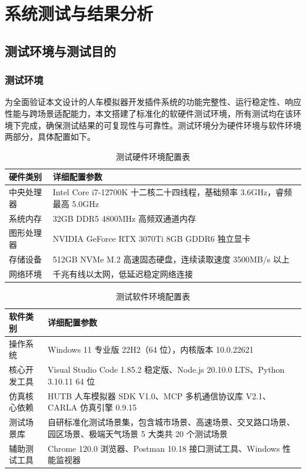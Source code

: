 
\chapter{系统测试与结果分析}

\section{测试环境与测试目的}

\subsection{测试环境}

为全面验证本文设计的人车模拟器开发插件系统的功能完整性、运行稳定性、响应性能与跨场景适配能力，本文搭建了标准化的软硬件测试环境，所有测试均在该环境下完成，确保测试结果的可复现性与可靠性。测试环境分为硬件环境与软件环境两部分，具体配置如下。

\begin{table}[H]
\centering
\caption{测试硬件环境配置表}
\label{tab:5-1}
\small
\renewcommand{\arraystretch}{1.18}
\begin{tabularx}{\textwidth}{p{}X}
\toprule
硬件类别 & 详细配置参数 \\
\midrule
中央处理器 & Intel Core i7-12700K 十二核二十四线程，基础频率 3.6GHz，睿频最高 5.0GHz \\
系统内存 & 32GB DDR5 4800MHz 高频双通道内存 \\
图形处理器 & NVIDIA GeForce RTX 3070Ti 8GB GDDR6 独立显卡 \\
存储设备 & 512GB NVMe M.2 高速固态硬盘，连续读取速度 3500MB/s 以上 \\
网络环境 & 千兆有线以太网，低延迟稳定网络连接 \\
\bottomrule
\end{tabularx}
\end{table}



\begin{table}[H]
\centering
\caption{测试软件环境配置表}
\label{tab:5-2}
\small
\renewcommand{\arraystretch}{1.18}
\begin{tabularx}{\textwidth}{p{}X}
\toprule
软件类别 & 详细配置参数 \\
\midrule
操作系统 & Windows 11 专业版 22H2（64 位），内核版本 10.0.22621 \\
核心开发工具 & Visual Studio Code 1.85.2 稳定版、Node.js 20.10.0 LTS、Python 3.10.11 64 位 \\
仿真核心依赖 & HUTB 人车模拟器 SDK V1.0、MCP 多机通信协议库 V2.1、CARLA 仿真引擎 0.9.15 \\
测试场景库 & 自研标准化测试场景集，包含城市场景、高速场景、交叉路口场景、园区场景、极端天气场景 5 大类共 20 个测试场景 \\
辅助测试工具 & Chrome 120.0 浏览器、Postman 10.18 接口测试工具、Windows 性能监视器 \\
\bottomrule
\end{tabularx}
\end{table}



